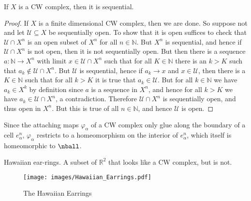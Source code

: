             \begin{theorem}
                If $X$ is a CW complex, then it is sequential.
            \end{theorem}
            \begin{proof}
                If $X$ is a finite dimensional CW complex, then we are
                done. So suppose not and let $\mathcal{U}\subseteq{X}$
                be sequentially open. To show that it is open suffices
                to check that $\mathcal{U}\cap{X}^{n}$ is an open subset
                of $X^{n}$ for all $n\in\mathbb{N}$. But $X^{n}$ is
                sequential, and hence if $\mathcal{U}\cap{X}^{n}$ is not
                open, then it is not sequentially open. But then there
                is a sequence $a:\mathbb{N}\rightarrow{X}^{n}$ with
                limit $x\in\mathcal{U}\cap{X}^{n}$ such that for all
                $K\in\mathbb{N}$ there is an $k>K$ such that
                $a_{k}\notin\mathcal{U}\cap{X}^{n}$. But $\mathcal{U}$
                is sequential, hence if $a_{k}\rightarrow{x}$ and
                $x\in\mathcal{U}$, then there is a $K\in\mathbb{N}$ such
                that for all $k>K$ it is true that $a_{k}\in\mathcal{U}$.
                But for all $k\in\mathbb{N}$ we have $a_{k}\in{X}^{k}$
                by definition since $a$ is a sequence in $X^{n}$, and
                hence for all $k>K$ we have $a_{k}\in\mathcal{U}\cap{X}^{n}$,
                a contradiction. Therefore $\mathcal{U}\cap{X}^{n}$ is
                sequentially open, and thus open in $X^{n}$. But this is
                true of all $n\in\mathbb{N}$, and hence $\mathcal{U}$ is
                open.
            \end{proof}
            \par\hfill\par
            Since the attaching maps $\varphi_{\alpha}$ of a CW complex
            only glue along the boundary of a cell $e_{\alpha}^{n}$,
            $\varphi_{\alpha}$ restricts to a homeomorphism on the
            interior of $e_{\alpha}^{n}$, which itself is homeomorphic
            to $\nball$.
            \begin{example}
                Hawaiian ear-rings. A subset of $\mathbb{R}^{2}$ that
                looks like a CW complex, but is not.
            \end{example}
            \begin{figure}[H]
                \centering
                \captionsetup{type=figure}
                \texttt{[image: images/Hawaiian\_Earrings.pdf]}
                \caption{The Hawaiian Earrings}
                \label{fig:Hawaiian_Earrings}
            \end{figure}
